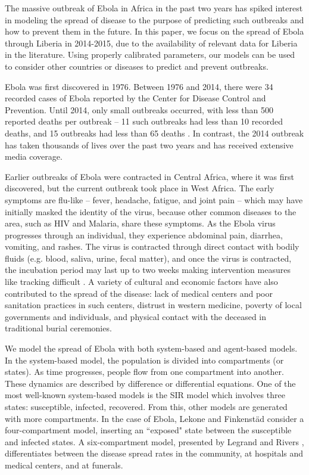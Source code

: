 The massive outbreak of Ebola in Africa in the past two years has spiked interest in modeling the spread of disease to the purpose of predicting such outbreaks and how to prevent them in the future. In this paper, we focus on the spread of Ebola through Liberia in 2014-2015, due to the availability of relevant data for Liberia in the literature. Using properly calibrated parameters, our models can be used to consider other countries or diseases to predict and prevent outbreaks.

Ebola was first discovered in 1976. Between 1976 and 2014, there were 34 recorded cases of Ebola reported by the Center for Disease Control and Prevention. Until 2014, only small outbreaks occurred, with less than 500 reported deaths per outbreak -- 11 such outbreaks had less than 10 recorded deaths, and 15 outbreaks had less than 65 deaths \cite{CDCOutbreaks}. In contrast, the 2014 outbreak has taken thousands of lives over the past two years and has received extensive media coverage.

Earlier outbreaks of Ebola were contracted in Central Africa, where it was first discovered, but the current outbreak took place in West Africa. The early symptoms are flu-like -- fever, headache, fatigue, and joint pain -- which may have initially masked the identity of the virus, because other common diseases to the area, such as HIV and Malaria, share these symptoms. As the Ebola virus progresses through an individual, they experience abdominal pain, diarrhea, vomiting, and rashes. The virus is contracted through direct contact with bodily fluids (e.g. blood, saliva, urine, fecal matter), and once the virus is contracted, the incubation period may last up to two weeks making intervention measures like tracking difficult \cite{CDCSympt}. A variety of cultural and economic factors have also contributed to the spread of the disease: lack of medical centers and poor sanitation practices in such centers, distrust in western medicine, poverty of local governments and individuals, and physical contact with the deceased in traditional burial ceremonies\cite{WHOReasons}.

We model the spread of Ebola with both system-based and agent-based models. In the system-based model, the population is divided into compartments (or states). As time progresses, people flow from one compartment into another. These dynamics are described by difference or differential equations. One of the most well-known system-based models is the SIR model which involves three states: susceptible, infected, recovered. From this, other models are generated with more compartments. In the case of Ebola, Lekone and Finkenstäd \cite{Lekone2006} consider a four-compartment model, inserting an ``exposed" state between the susceptible and infected states. A six-compartment model, presented by Legrand \cite{Legrand2007} and Rivers \cite{Rivers2014}, differentiates between the disease spread rates in the community, at hospitals and medical centers, and at funerals.

